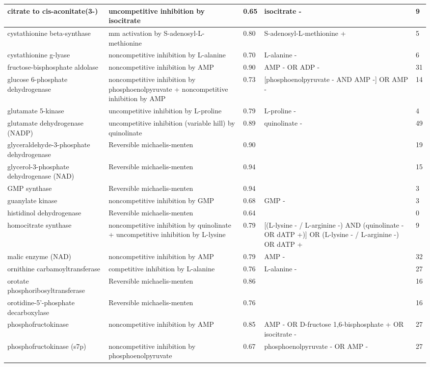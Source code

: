\begin{singlespace}
\begin{landscape}
\begin{longtable}{|L{4cm} | L{7cm} || R{1.5cm} | L{7cm} | R{1.75cm}|}
citrate to cis-aconitate(3-)&uncompetitive inhibition by isocitrate &0.65&isocitrate -&9\\\hline
cystathionine beta-synthase&mm activation by S-adenosyl-L-methionine &0.80&S-adenosyl-L-methionine +&5\\\hline
cystathionine g-lyase&noncompetitive inhibition by L-alanine &0.70&L-alanine -&6\\\hline
fructose-bisphosphate aldolase&noncompetitive inhibition by AMP &0.90&AMP - OR ADP -&31\\\hline
glucose 6-phosphate dehydrogenase&noncompetitive inhibition by phosphoenolpyruvate + noncompetitive inhibition by AMP &0.73&[phosphoenolpyruvate - AND AMP -] OR AMP -&14\\\hline
glutamate 5-kinase&uncompetitive inhibition by L-proline &0.79&L-proline -&4\\\hline
glutamate dehydrogenase (NADP)&uncompetitive inhibition (variable hill) by quinolinate &0.89&quinolinate -&49\\\hline
glyceraldehyde-3-phosphate dehydrogenase&Reversible michaelis-menten &0.90&&19\\\hline
glycerol-3-phosphate dehydrogenase (NAD)&Reversible michaelis-menten &0.94&&15\\\hline
GMP synthase&Reversible michaelis-menten &0.94&&3\\\hline
guanylate kinase&noncompetitive inhibition by GMP &0.68&GMP -&3\\\hline
histidinol dehydrogenase&Reversible michaelis-menten &0.64&&0\\\hline
homocitrate synthase&noncompetitive inhibition by quinolinate + uncompetitive inhibition by L-lysine &0.79&[(L-lysine - / L-arginine -) AND (quinolinate - OR dATP +)] OR (L-lysine - / L-arginine -) OR dATP +&9\\\hline
malic enzyme (NAD)&noncompetitive inhibition by AMP &0.79&AMP -&32\\\hline
ornithine carbamoyltransferase&competitive inhibition by L-alanine &0.76&L-alanine -&27\\\hline
orotate phosphoribosyltransferase&Reversible michaelis-menten &0.86&&16\\\hline
orotidine-5'-phosphate decarboxylase&Reversible michaelis-menten &0.76&&16\\\hline
phosphofructokinase&noncompetitive inhibition by AMP &0.85&AMP - OR D-fructose 1,6-bisphosphate + OR isocitrate -&27\\\hline
phosphofructokinase (s7p)&noncompetitive inhibition by phosphoenolpyruvate &0.67&phosphoenolpyruvate - OR AMP -&27\\\hline

\end{longtable}
\end{landscape}
\end{singlespace}
